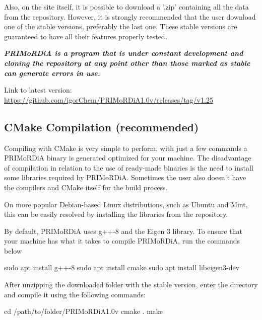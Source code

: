 \documentclass[a4paper,11pt]{refart}
\begin{document}
	Also, on the site itself, it is possible to download a '.zip' containing all the data from the repository.
	However, it is strongly recommended that the user download one of the stable versions, preferably the last one. These stable versions are guaranteed to have all their features properly tested.

	\emph{\textbf{PRIMoRDiA is a program that is under constant development and cloning the repository at any point other than those marked as stable can generate errors in use. }}

	Link to latest version: \url{https://github.com/igorChem/PRIMoRDiA1.0v/releases/tag/v1.25}

	\subsection{CMake Compilation (recommended) }

	Compiling with CMake is very simple to perform, with just a few commands a PRIMoRDiA binary is generated optimized for your machine. The disadvantage of compilation in relation to the use of ready-made binaries is the need to install some libraries required by PRIMoRDiA. Sometimes the user also doesn't have the compilers and CMake itself for the build process.

	On more popular Debian-based Linux distributions, such as Ubuntu and Mint, this can be easily resolved by installing the libraries from the repository.

	By default, PRIMoRDiA uses g++-8 and the Eigen 3 library. To ensure that your machine has what it takes to compile PRIMoRDiA, run the commands below

\hspace*{-\leftmarginwidth}
\begin{minipage}{\fullwidth}
\begin{commandshell}sudo apt install g++-8 
sudo apt install cmake
sudo apt install libeigen3-dev\end{commandshell}
\end{minipage}

	After unzipping the downloaded folder with the stable version, enter the directory and compile it using the following commands:

\hspace*{-\leftmarginwidth}
\begin{minipage}{\fullwidth}
\begin{commandshell}cd /path/to/folder/PRIMoRDiA1.0v
cmake .
make
\end{commandshell}
\end{minipage}
\end{document}
